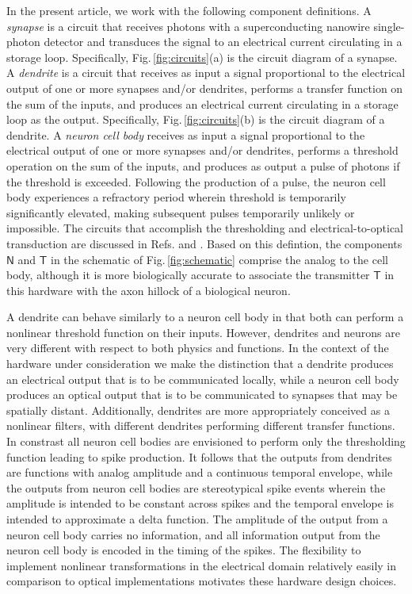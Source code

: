 \documentclass[twocolumn]{article}
\newcommand{\onlinecite}[1]{\hspace{-1 ex} \nocite{#1}\citenum{#1}}
\begin{document}
In the present article, we work with the following component definitions. A \textit{synapse} is a circuit that receives photons with a superconducting nanowire single-photon detector and transduces the signal to an electrical current circulating in a storage loop. Specifically, Fig.\,\ref{fig:circuits}(a) is the circuit diagram of a synapse. A \textit{dendrite} is a circuit that receives as input a signal proportional to the electrical output of one or more synapses and/or dendrites, performs a transfer function on the sum of the inputs, and produces an electrical current circulating in a storage loop as the output. Specifically, Fig.\,\ref{fig:circuits}(b) is the circuit diagram of a dendrite. A \textit{neuron cell body} receives as input a signal proportional to the electrical output of one or more synapses and/or dendrites, performs a threshold operation on the sum of the inputs, and produces as output a pulse of photons if the threshold is exceeded. Following the production of a pulse, the neuron cell body experiences a refractory period wherein threshold is temporarily significantly elevated, making subsequent pulses temporarily unlikely or impossible. The circuits that accomplish the thresholding and electrical-to-optical transduction are discussed in Refs.\onlinecite{sh2018} and \onlinecite{sh2018_full}. Based on this defintion, the components $\mathsf{N}$ and $\mathsf{T}$ in the schematic of Fig.\,\ref{fig:schematic} comprise the analog to the cell body, although it is more biologically accurate to associate the transmitter $\mathsf{T}$ in this hardware with the axon hillock of a biological neuron. 

A dendrite can behave similarly to a neuron cell body in that both can perform a nonlinear threshold function on their inputs. However, dendrites and neurons are very different with respect to both physics and functions. In the context of the hardware under consideration we make the distinction that a dendrite produces an electrical output that is to be communicated locally, while a neuron cell body produces an optical output that is to be communicated to synapses that may be spatially distant. Additionally, dendrites are more appropriately conceived as a nonlinear filters, with different dendrites performing different transfer functions. In constrast all neuron cell bodies are envisioned to perform only the thresholding function leading to spike production. It follows that the outputs from dendrites are functions with analog amplitude and a continuous temporal envelope, while the outputs from neuron cell bodies are stereotypical spike events wherein the amplitude is intended to be constant across spikes and the temporal envelope is intended to approximate a delta function. The amplitude of the output from a neuron cell body carries no information, and all information output from the neuron cell body is encoded in the timing of the spikes. The flexibility to implement nonlinear transformations in the electrical domain relatively easily in comparison to optical implementations motivates these hardware design choices.
\end{document}

